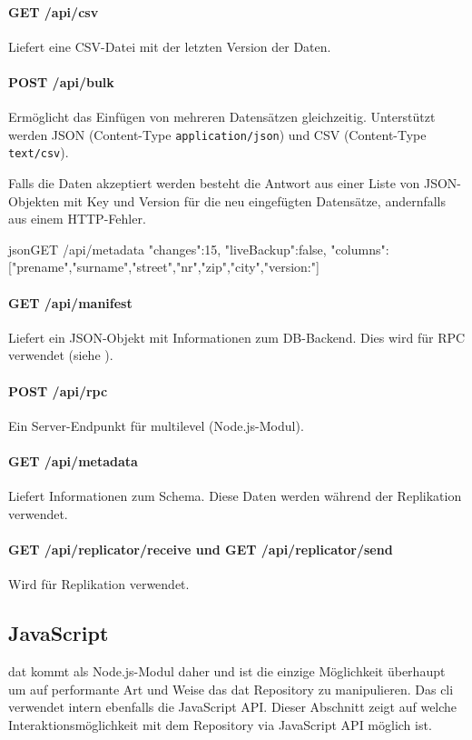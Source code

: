 \paragraph{GET /api/csv}
Liefert eine CSV-Datei mit der letzten Version der Daten.

\paragraph{POST /api/bulk}
Ermöglicht das Einfügen von mehreren Datensätzen gleichzeitig. Unterstützt werden JSON (Content-Type \texttt{application/json}) und CSV (Content-Type \texttt{text/csv}).

Falls die Daten akzeptiert werden besteht die Antwort aus einer Liste von JSON-Objekten mit Key und Version für die neu eingefügten Datensätze, andernfalls aus einem HTTP-Fehler.

\begin{srclst}{json}{GET /api/metadata}
{
    "changes":15, 
    "liveBackup":false, 
    "columns":["prename","surname","street","nr","zip","city","version:"]
}
\end{srclst}

\paragraph{GET /api/manifest}
Liefert ein JSON-Objekt mit Informationen zum DB-Backend. Dies wird für RPC verwendet (siehe ).

\paragraph{POST /api/rpc}
Ein Server-Endpunkt für multilevel (Node.js-Modul).

\paragraph{GET /api/metadata}
Liefert Informationen zum Schema. Diese Daten werden während der Replikation verwendet.

\paragraph{GET /api/replicator/receive und GET /api/replicator/send}
Wird für Replikation verwendet.

\subsection{JavaScript}
dat kommt als Node.js-Modul daher und ist die einzige Möglichkeit überhaupt um auf performante Art und Weise das \gls{dat} Repository zu manipulieren. Das \gls{cli} verwendet intern ebenfalls die JavaScript API. Dieser Abschnitt zeigt auf welche Interaktionsmöglichkeit mit dem Repository via JavaScript API möglich ist.

